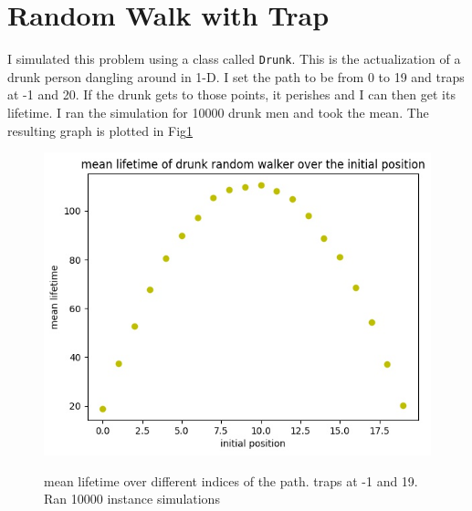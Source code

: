 \documentclass[12pt]{article}
\begin{document}
	\section{Random Walk with Trap}
	I simulated this problem using a class called \texttt{Drunk}. This is the actualization of a 
	drunk person dangling around in 1-D. I set the path to be from 0 to 19 and traps at -1 and 20.
	If the drunk gets to those points, it perishes and I can then get its lifetime.
	I ran the simulation for 10000 drunk men and took the mean.
	The resulting graph is plotted in Fig\ref{fig:rw_trap}
	\begin{figure}[h!]
		\centering
		\includegraphics[width=0.9\linewidth]{../p3/drunk.jpg}
		\label{fig:rw_trap}
		\caption{mean lifetime over different indices of the path. traps at -1 and 19. Ran 10000
		instance simulations}
	\end{figure}
\end{document}
